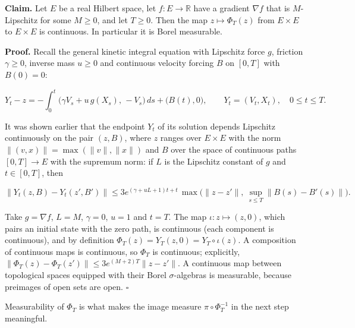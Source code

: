 \documentclass[11pt,a4paper]{article}
\begin{document}
\textbf{Claim.} Let \(E\) be a real Hilbert space, let \(f:E\to\mathbb R\) have a gradient \(\nabla f\) that is \(M\)-Lipschitz for some \(M\ge0\), and let \(T\ge0\). Then the map \(z\mapsto\Phi_T(z)\) from \(E\times E\) to \(E\times E\) is continuous. In particular it is Borel measurable.




\textbf{Proof.} Recall the general kinetic integral equation with Lipschitz force \(g\), friction \(\gamma\ge0\), inverse mass \(u\ge0\) and continuous velocity forcing \(B\) on \([0,T]\) with \(B(0)=0\):


\[Y_t-z=-\int_0^t\bigl(\gamma V_s+u\,g(X_s),\,-V_s\bigr)\,ds+\bigl(B(t),0\bigr),\qquad Y_t=(V_t,X_t),\quad 0\le t\le T.\]


It was shown earlier that the endpoint \(Y_t\) of its solution depends Lipschitz continuously on the pair \((z,B)\), where \(z\) ranges over \(E\times E\) with the norm \(\|(v,x)\|=\max(\|v\|,\|x\|)\) and \(B\) over the space of continuous paths \([0,T]\to E\) with the supremum norm: if \(L\) is the Lipschitz constant of \(g\) and \(t\in[0,T]\), then


\[\|Y_t(z,B)-Y_t(z',B')\|\le3e^{(\gamma+uL+1)t+t}\,\max\bigl(\|z-z'\|,\ \sup_{s\le T}\|B(s)-B'(s)\|\bigr).\]


Take \(g=\nabla f\), \(L=M\), \(\gamma=0\), \(u=1\) and \(t=T\). The map \(\iota:z\mapsto(z,0)\), which pairs an initial state with the zero path, is continuous (each component is continuous), and by definition \(\Phi_T(z)=Y_T(z,0)=Y_T\circ\iota(z)\). A composition of continuous maps is continuous, so \(\Phi_T\) is continuous; explicitly, \(\|\Phi_T(z)-\Phi_T(z')\|\le3e^{(M+2)T}\|z-z'\|\). A continuous map between topological spaces equipped with their Borel \(\sigma\)-algebras is measurable, because preimages of open sets are open. \(\square\)




Measurability of \(\Phi_T\) is what makes the image measure \(\pi\circ\Phi_T^{-1}\) in the next step meaningful.
\end{document}
